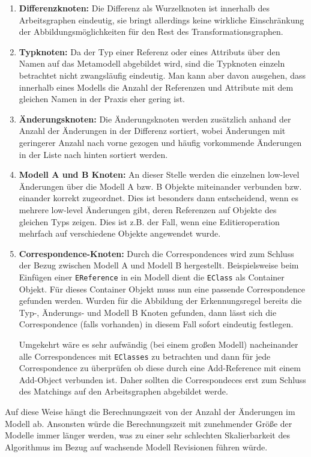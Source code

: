 \begin{enumerate}
  \item \textbf{Differenzknoten:} Die Differenz als Wurzelknoten ist innerhalb des Arbeitsgraphen
  eindeutig, sie bringt allerdings keine wirkliche Einschränkung der Abbildungsmöglichkeiten für
  den Rest des Transformationsgraphen.
 
  \item \textbf{Typknoten:} Da der Typ einer Referenz oder eines Attributs über den Namen auf das
  Metamodell abgebildet wird, sind die Typknoten einzeln betrachtet nicht zwangsläufig eindeutig.
  Man kann aber davon ausgehen, dass innerhalb eines Modells die Anzahl der Referenzen und Attribute
  mit dem gleichen Namen in der Praxis eher gering ist.
 
  \item \textbf{Änderungsknoten:} Die Änderungsknoten werden zusätzlich anhand der Anzahl der
  Änderungen in der Differenz sortiert, wobei Änderungen mit geringerer Anzahl nach vorne gezogen
  und häufig vorkommende Änderungen in der Liste nach hinten sortiert werden.
 
  \item \textbf{Modell A und B Knoten:} An dieser Stelle werden die einzelnen low-level Änderungen
  über die Modell A bzw. B Objekte miteinander verbunden bzw. einander korrekt zugeordnet. Dies ist
  besonders dann entscheidend, wenn es mehrere low-level Änderungen gibt, deren Referenzen auf
  Objekte des gleichen Typs zeigen. Dies ist z.B. der Fall, wenn eine Editieroperation mehrfach auf
  verschiedene Objekte angewendet wurde.
 
  \item \textbf{Correspondence-Knoten:} Durch die Correspondences wird zum Schluss der Bezug
  zwischen Modell A und Modell B hergestellt.
  Beispielsweise beim Einfügen einer \texttt{EReference}  in ein Modell dient die \texttt{EClass}
  als Container Objekt. Für dieses Container Objekt muss nun eine passende Correspondence gefunden
  werden. Wurden für die Abbildung der Erkennungsregel bereits die Typ-, Änderungs- und Modell B
  Knoten gefunden, dann lässt sich die Correspondence (falls vorhanden) in diesem Fall sofort
  eindeutig festlegen.
  
  Umgekehrt wäre es sehr aufwändig (bei einem großen Modell) nacheinander alle Correspondences mit
  \texttt{EClasses} zu betrachten und dann für jede Correspondence zu überprüfen ob diese  durch 
  eine Add-Reference mit einem Add-Object verbunden ist. Daher sollten die Correspondeces erst zum
  Schluss des Matchings auf den Arbeitsgraphen abgebildet werde.
\end{enumerate}
Auf diese Weise hängt die Berechnungszeit von der Anzahl der Änderungen im Modell ab. Ansonsten
würde die Berechnungszeit mit zunehmender Größe der Modelle immer länger werden, was zu einer
sehr schlechten Skalierbarkeit des Algorithmus im Bezug auf wachsende Modell Revisionen führen
würde.

